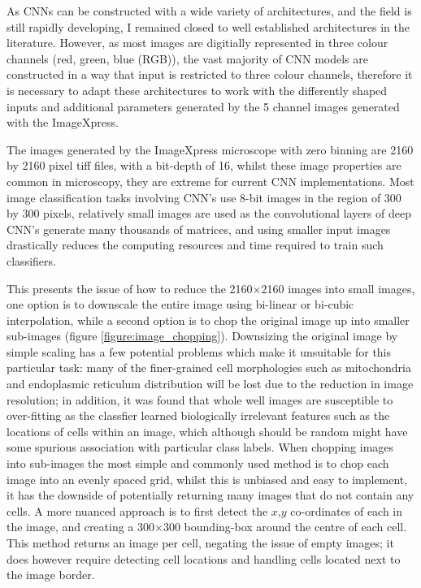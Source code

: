 \documentclass[a4paper,11pt,twoside,openright]{scrbook}
\begin{document}

As CNNs can be constructed with a wide variety of architectures, and the field is still rapidly developing, I remained closed to well established architectures in the literature.
However, as most images are digitially represented in three colour channels (red, green, blue (RGB)), the vast majority of CNN models are constructed in a way that input is restricted to three colour channels, therefore it is necessary to adapt these architectures to work with the differently shaped inputs and additional parameters generated by the 5 channel images generated with the ImageXpress.



The images generated by the ImageXpress microscope with zero binning are 2160 by 2160 pixel tiff files, with a bit-depth of 16, whilst these image properties are common in microscopy, they are extreme for current CNN implementations.
Most image classification tasks involving CNN's use 8-bit images in the region of 300 by 300 pixels, relatively small images are used as the convolutional layers of deep CNN's generate many thousands of matrices, and using smaller input images drastically reduces the computing resources and time required to train such classifiers.

This presents the issue of how to reduce the 2160$\times$2160 images into small images, one option is to downscale the entire image using bi-linear or bi-cubic interpolation, while a second option is to chop the original image up into smaller sub-images (figure \ref{figure:image_chopping}).
Downsizing the original image by simple scaling has a few potential problems which make it unsuitable for this particular task:
    many of the finer-grained cell morphologies such as mitochondria and endoplasmic reticulum distribution will be lost due to the reduction in image resolution;
    in addition, it was found that whole well images are susceptible to over-fitting as the classfier learned biologically irrelevant features such as the locations of cells within an image, which although should be random might have some spurious association with particular class labels.
When chopping images into sub-images the most simple and commonly used method is to chop each image into an evenly spaced grid, whilst this is unbiased and easy to implement, it has the downside of potentially returning many images that do not contain any cells.
A more nuanced approach is to first detect the $x$,$y$ co-ordinates of each  in the image, and creating a 300$\times$300 bounding-box around the centre of each cell.
This method returns an image per cell, negating the issue of empty images; it does however require detecting cell locations and handling cells located next to the image border.
\end{document}

